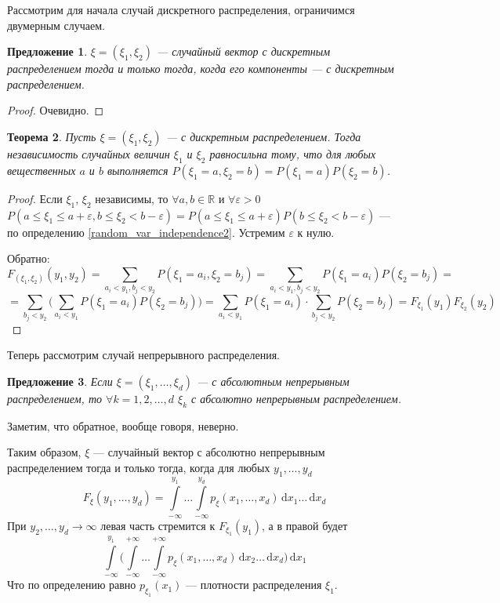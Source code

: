 \documentclass[11pt,openany,a4paper]{scrartcl}
\theoremstyle{plain}
\newtheorem{theorem}{Теорема}[section]
\newtheorem{proposition}[theorem]{Предложение}
\theoremstyle{definition}
\newcommand\mb{\mathbb}
\newcommand\real{\mb R}
\newcommand{\dif}{\, \mathrm d}
\begin{document}
Рассмотрим для начала случай дискретного распределения, ограничимся двумерным 
случаем.

\begin{proposition}
    $\xi = (\xi_1, \xi_2)$ — случайный вектор с дискретным распределением
    тогда и только тогда, когда его компоненты — с дискретным распределением.
\end{proposition}
\begin{proof}
    Очевидно.
\end{proof}

\begin{theorem}
    Пусть $\xi = (\xi_1, \xi_2)$ — с дискретным распределением.
    Тогда независимость
    случайных величин $\xi_1$ и $\xi_2$ равносильна тому, что для любых 
    вещественных $a$ и $b$ выполняется $P(\xi_1 = a, \xi_2 = b) =
    P(\xi_1 = a)P(\xi_2 = b)$.
\end{theorem}
\begin{proof}
        Если $\xi_1$, $\xi_2$ независимы, то
        $\forall a,b \in \real$ и $\forall \varepsilon > 0$
        $P(a \leqslant \xi_1 \leqslant a + \varepsilon,
        b \leqslant \xi_2 < b - \varepsilon) =
        P(a \leqslant \xi_1 \leqslant a + \varepsilon)
        P(b \leqslant \xi_2 < b - \varepsilon)$ — по определению 
        \ref{random_var_independence2}. Устремим $\varepsilon$ к нулю.
        
        Обратно:
        $$
        F_{(\xi_1, \xi_2)}(y_1, y_2) =
        \sum\limits_{a_i < y_1, b_j < y_2} P(\xi_1 = a_i, \xi_2 = b_j) =
        \sum\limits_{a_i < y_1, b_j < y_2} P(\xi_1 = a_i)P(\xi_2 = b_j) =
        $$
        $$
        = \sum\limits_{b_j < y_2}\Bigg(\sum\limits_{a_i < y_1}
        P(\xi_1 = a_i)P(\xi_2 = b_j)\Bigg) =
        \sum\limits_{a_i < y_1} P(\xi_1 = a_i) \cdot
        \sum\limits_{b_j < y_2} P(\xi_2 = b_j) =
        F_{\xi_1}(y_1) F_{\xi_2}(y_2)
        $$
\end{proof}

Теперь рассмотрим случай непрерывного распределения.

\begin{proposition}
    Если $\xi = (\xi_1, \ldots, \xi_d)$ — с абсолютным непрерывным распределением,
    то $\forall k = 1, 2,\ldots, d$ $\xi_k$ с абсолютно непрерывным 
    распределением.
\end{proposition}

Заметим, что обратное, вообще говоря, неверно.

Таким образом, $\xi$ — случайный вектор с абсолютно непрерывным 
распределением тогда и только тогда, когда для любых $y_1, \ldots, y_d$
$$
F_\xi(y_1, \ldots, y_d) = \int\limits_{-\infty}^{y_1}\ldots
\int\limits_{-\infty}^{y_d} p_\xi(x_1, \ldots, x_d) \dif x_1\ldots \dif x_d
$$
При $y_2, \ldots, y_d \to \infty$ левая часть стремится к $F_{\xi_1}(y_1)$,
а в правой будет
$$
\int\limits_{-\infty}^{y_1}\Bigg(\int\limits_{-\infty}^{+\infty}\ldots
\int\limits_{-\infty}^{+\infty} p_\xi(x_1, \ldots, x_d)
\dif x_2\ldots\dif x_d\Bigg)\dif x_1
$$
Что по определению равно $p_{\xi_1}(x_1)$ — плотности распределения $\xi_1$.
\end{document}
